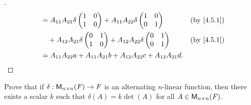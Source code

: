\begin{proof}[]
\begin{align*}
                          & = A_{1 1} A_{2 1} \delta\begin{pmatrix}
                                                      1 & 0 \\
                                                      1 & 0
                                                    \end{pmatrix} + A_{1 1} A_{2 2} \delta\begin{pmatrix}
                                                                                            1 & 0 \\
                                                                                            0 & 1
                                                                                          \end{pmatrix}                            &  & \text{(by \cref{4.5.1})}       \\
                          & \quad + A_{1 2} A_{2 1} \delta\begin{pmatrix}
                                                            0 & 1 \\
                                                            1 & 0
                                                          \end{pmatrix} + A_{1 2} A_{2 2} \delta\begin{pmatrix}
                                                                                                  0 & 1 \\
                                                                                                  0 & 1
                                                                                                \end{pmatrix}                            &  & \text{(by \cref{4.5.1})} \\
                          & = A_{1 1} A_{2 2} a + A_{1 1} A_{2 1} b + A_{1 2} A_{2 2} c + A_{1 2} A_{2 1} d.
  \end{align*}
\end{proof}

\begin{ex}\label{ex:4.5.16}
  Prove that if \(\delta : \mathsf{M}_{{n} \times n}({\mathit{F}}) \to \mathit{F}\) is an alternating \(n\)-linear function, then there exists a scalar \(k\) such that \(\delta(A) = k \det(A)\) for all \(A \in \mathsf{M}_{{n} \times n}({\mathit{F}})\).
\end{ex}


